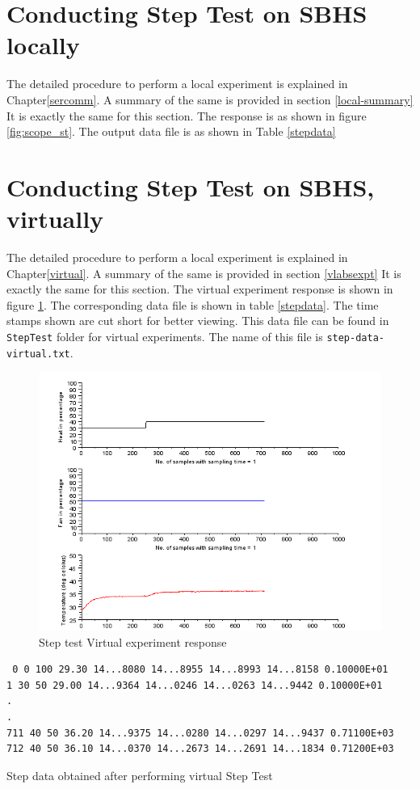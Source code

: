 \section{Conducting Step Test on SBHS locally}
The detailed procedure to perform a local experiment is explained in Chapter\ref{sercomm}. A summary of the same is provided in section \ref{local-summary} It is exactly the same for this section. The response is as shown in figure \ref{fig:scope_st}. The output data file is as shown in Table \ref{stepdata}
\section{Conducting Step Test on SBHS, virtually}
The detailed procedure to perform a local experiment is explained in Chapter\ref{virtual}. A summary of the same is provided in section \ref{vlabsexpt} It is exactly the same for this section. The virtual experiment response is shown in figure \ref{step-virtual}. The corresponding data file is shown in table \ref{stepdata}. The time stamps shown are cut short for better viewing. This data file can be found in {\tt StepTest} folder for virtual experiments. The name of this file is {\tt step-data-virtual.txt}.


\begin{figure}
\centering
\includegraphics[width=\linewidth]{Step-test_manual/step-virtual.png}
\caption{Step test Virtual experiment response}
\label{step-virtual}
\end{figure}


\begin{table}
\begin{verbatim}
 0 0 100 29.30 14...8080 14...8955 14...8993 14...8158 0.10000E+01
1 30 50 29.00 14...9364 14...0246 14...0263 14...9442 0.10000E+01
.
.
711 40 50 36.20 14...9375 14...0280 14...0297 14...9437 0.71100E+03
712 40 50 36.10 14...0370 14...2673 14...2691 14...1834 0.71200E+03
\end{verbatim}
\caption{Step data obtained after performing virtual Step Test}
\label{stepdata}
\end{table}

